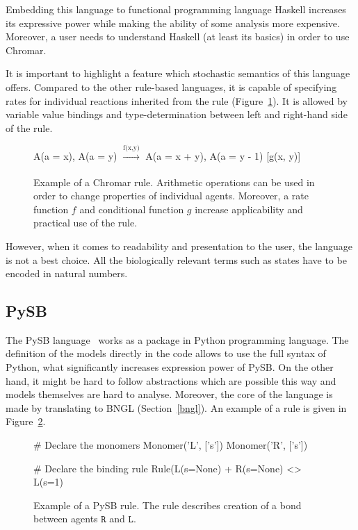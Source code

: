 \documentclass[12pt, twoside]{fithesis2} %
\begin{document}
Embedding this language to functional programming language Haskell increases its expressive power while making the ability of some analysis more expensive. Moreover, a user needs to understand Haskell (at least its basics) in order to use Chromar.

It is important to highlight a feature which stochastic semantics of this language offers. Compared to the other rule-based languages, it is capable of specifying rates for individual reactions inherited from the rule (Figure~\ref{chromar_rule}). It is allowed by variable value bindings and type-determination between left and right-hand side of the rule.

\begin{figure}[!h]
\begin{center}
A(a = x), A(a = y) $\xrightarrow[]{\text{f(x,y)}}$ A(a = x + y), A(a = y - 1) [g(x, y)]
\end{center}
\caption{Example of a Chromar rule. Arithmetic operations can be used in order to change properties of individual agents. Moreover, a rate function $f$ and conditional function $g$ increase applicability and practical use of the rule.}\label{chromar-rule}\label{chromar_rule}
\end{figure}

However, when it comes to readability and presentation to the user, the language is not a best choice. All the biologically relevant terms such as states have to be encoded in natural numbers.

\subsection{PySB}

The PySB language~\cite{Lopez646} works as a package in Python programming language. The definition of the models directly in the code allows to use the full syntax of Python, what significantly increases expression power of PySB. On the other hand, it might be hard to follow abstractions which are possible this way and models themselves are hard to analyse. Moreover, the core of the language is made by translating to BNGL (Section~\ref{bngl}). An example of a rule is given in Figure~\ref{pysb_rule}.

\begin{figure}[!h]
\begin{center}
\begin{python}
# Declare the monomers
Monomer('L', ['s'])
Monomer('R', ['s'])

# Declare the binding rule
Rule(L(s=None) + R(s=None) <> L(s=1) %
\end{python}
\end{center}
\caption{Example of a PySB rule. The rule describes creation of a bond between agents $\mathtt{R}$ and $\mathtt{L}$.}\label{PySB-rule}\label{pysb_rule}
\end{figure}
\end{document}
